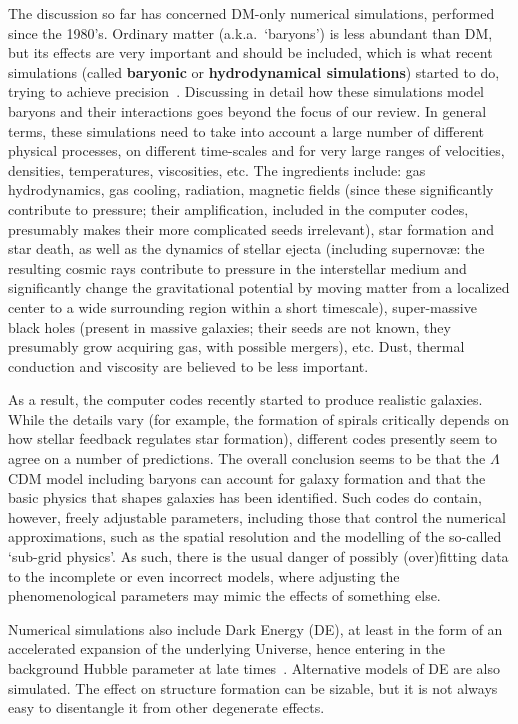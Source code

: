 \medskip

The discussion so far has concerned DM-only numerical simulations, performed since the 1980's. Ordinary matter (a.k.a.~`baryons') is less abundant than DM, but its effects are very important and should be included, which is what recent simulations (called {\bf baryonic} or {\bf hydrodynamical simulations}) started to do, trying to achieve precision~\cite{Sims_with_baryons}. 
Discussing in detail how these simulations model baryons and their interactions goes beyond the focus of our review. In general terms, these simulations need to take into account a large number of different physical processes, on different time-scales and for very large ranges of velocities, densities, temperatures, viscosities, etc. 
The ingredients include: gas hydrodynamics,
gas cooling, radiation, magnetic fields (since these significantly contribute to pressure; their amplification, included in the computer codes,
presumably makes their more complicated seeds irrelevant),
star formation and star death, as well as the dynamics of stellar ejecta (including supernov\ae{}:
the resulting cosmic rays contribute to pressure in the interstellar medium and significantly change the gravitational potential by moving matter from a localized center to a wide surrounding region within a short timescale),
 super-massive black holes (present in massive galaxies; their seeds are not known, they presumably grow acquiring gas, with possible mergers), etc.
 Dust, thermal conduction and viscosity are believed to be less important.

As a result, the computer codes recently started to produce realistic galaxies.
While the details vary (for example, the formation of spirals critically depends on how stellar feedback regulates star formation), different codes presently seem to agree on a number of predictions.
The overall conclusion seems to be that the $\Lambda$CDM model including baryons can account for galaxy formation and
that the basic physics that shapes galaxies has been identified.
Such codes do contain, however, freely adjustable parameters, including those that control the numerical approximations, such as the spatial resolution and the modelling of the so-called `sub-grid physics'. As such, there is the usual danger of possibly (over)fitting data to the incomplete or even incorrect models, where adjusting the phenomenological parameters may mimic the effects of something else. 

Numerical simulations also include Dark Energy (DE), at least in the form of an accelerated expansion of the underlying Universe, hence entering in the background Hubble parameter at late times~\cite{Sims_DE}. Alternative models of DE are also simulated. The effect on structure formation can be sizable, but it is not always easy to disentangle it from other degenerate effects. 

